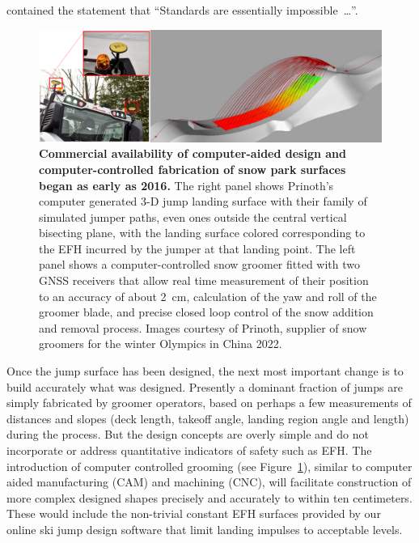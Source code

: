 \documentclass{article}
\begin{document}
contained the statement that ``Standards are essentially impossible~\ldots''.
%
\begin{figure}
  \centering
  \includegraphics[width=\columnwidth]{figures/prinoth.png}
  \caption{\textbf{Commercial availability of computer-aided design and
    computer-controlled fabrication of snow park surfaces began as early as
    2016.} The right panel shows Prinoth's computer generated 3-D jump landing
    surface with their family of simulated jumper paths, even ones outside the
    central vertical bisecting plane, with the landing surface colored
    corresponding to the EFH incurred by the jumper at that landing point. The
    left panel shows a computer-controlled snow groomer fitted with two GNSS
    receivers that allow real time measurement of their position to an accuracy
    of about 2~\si{\centi\meter}, calculation of the yaw and roll of the
    groomer blade, and precise closed loop control of the snow addition and
    removal process.  Images courtesy of Prinoth, supplier of snow groomers for
  the winter Olympics in China 2022.}
  \label{fig:prinoth}
\end{figure}

Once the jump surface has been designed, the next most important change is to
build accurately what was designed. Presently a dominant fraction of jumps are
simply fabricated by groomer operators, based on perhaps a few measurements of
distances and slopes (deck length, takeoff angle, landing region angle and
length) during the process. But the design concepts are overly simple and do
not incorporate or address quantitative indicators of safety such as EFH. The
introduction of computer controlled grooming (see Figure~\ref{fig:prinoth}),
similar to computer aided manufacturing (CAM) and machining (CNC), will facilitate
construction of more complex designed shapes precisely and accurately to within ten centimeters. These would include the
non-trivial constant EFH surfaces provided by our online ski jump design
software that limit landing impulses to acceptable levels.
\end{document}
